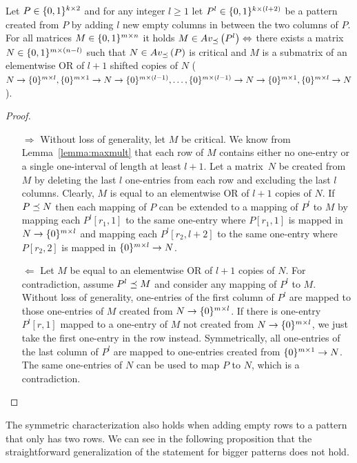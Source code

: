 \begin{thm}
\label{thm:emptymiddle}
Let $P\in\{0,1\}^{k\times2}$ and for any integer $l\geq1$ let $P^l\in\{0,1\}^{k\times(l+2)}$ be a pattern created from $P$ by adding $l$ new empty columns in between the two columns of $P$. For all matrices $M\in\{0,1\}^{m\times n}$ it holds $M\in Av_{\preceq}\left(P^l\right)\Leftrightarrow$ there exists a matrix $N\in\{0,1\}^{m\times(n-l)}$ such that $N\in Av_{\preceq}\left(P\right)$ is critical and $M$ is a submatrix of an elementwise OR of $l+1$ shifted copies of $N$ ($N\rightarrow\{0\}^{m\times l},\{0\}^{m\times 1}\rightarrow N\rightarrow\{0\}^{m\times(l-1)},\dots,\{0\}^{m\times(l-1)}\rightarrow N\rightarrow\{0\}^{m\times1},\{0\}^{m\times l}\rightarrow N$).
\end{thm}
\begin{proof}
\begin{itemize}
	\item[$\Rightarrow$] Without loss of generality, let $M$ be critical. We know from Lemma~\ref{lemma:maxmult} that each row of $M$ contains either no one-entry or a single one-interval of length at least $l+1$. Let a matrix~$N$ be created from $M$ by deleting the last $l$ one-entries from each row and excluding the last $l$ columns. Clearly, $M$ is equal to an elementwise OR of $l+1$ copies of $N$. If $P\preceq N$ then each mapping of $P$ can be extended to a mapping of $P^l$ to $M$ by mapping each $P^l[r_1,1]$ to the same one-entry where $P[r_1,1]$ is mapped in $N\rightarrow\{0\}^{m\times l}$ and mapping each $P^l[r_2,l+2]$ to the same one-entry where $P[r_2,2]$ is mapped in $\{0\}^{m\times l}\rightarrow N$.
	\item[$\Leftarrow$] Let $M$ be equal to an elementwise OR of $l+1$ copies of $N$. For contradiction, assume $P^l\preceq M$ and consider any mapping of $P^l$ to $M$. Without loss of generality, one-entries of the first column of $P^l$ are mapped to those one-entries of $M$ created from $N\rightarrow\{0\}^{m\times l}$. If there is one-entry $P^l[r,1]$ mapped to a one-entry of $M$ not created from $N\rightarrow\{0\}^{m\times l}$, we just take the first one-entry in the row instead. Symmetrically, all one-entries of the last column of $P^l$ are mapped to one-entries created from $\{0\}^{m\times1}\rightarrow N$. The same one-entries of $N$ can be used to map $P$ to $N$, which is a contradiction.
\end{itemize}
\end{proof}

The symmetric characterization also holds when adding empty rows to a pattern that only has two rows. We can see in the following proposition that the straightforward generalization of the statement for bigger patterns does not hold.

